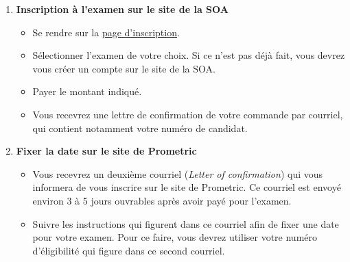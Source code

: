 \begin{enumerate}
\item \textbf{Inscription à l'examen sur le site de la SOA}
\begin{itemize}
\item Se rendre sur la \href{https://www.soa.org/Education/Exam-Req/Registration/edu-registration.aspx}{page d'inscription}. 
\item Sélectionner l'examen de votre choix. Si ce n'est pas déjà fait, vous devrez vous créer un compte sur le site de la SOA.
\item Payer le montant indiqué.
\item Vous recevrez une lettre de confirmation de votre commande par courriel, qui contient notamment votre numéro de candidat.
\end{itemize}\vspace{\baselineskip}

\item \textbf{Fixer la date sur le site de Prometric}
\begin{itemize}
\item Vous recevrez un deuxième courriel (\textit{Letter of confirmation}) qui vous informera de vous inscrire sur le site de Prometric. Ce courriel est envoyé environ 3 à 5 jours ouvrables après avoir payé pour l'examen.
\item Suivre les instructions qui figurent dans ce courriel afin de fixer une date pour votre examen. Pour ce faire, vous devrez utiliser votre numéro d'éligibilité qui figure dans ce second courriel.
\end{itemize}
\end{enumerate}

\newpage
